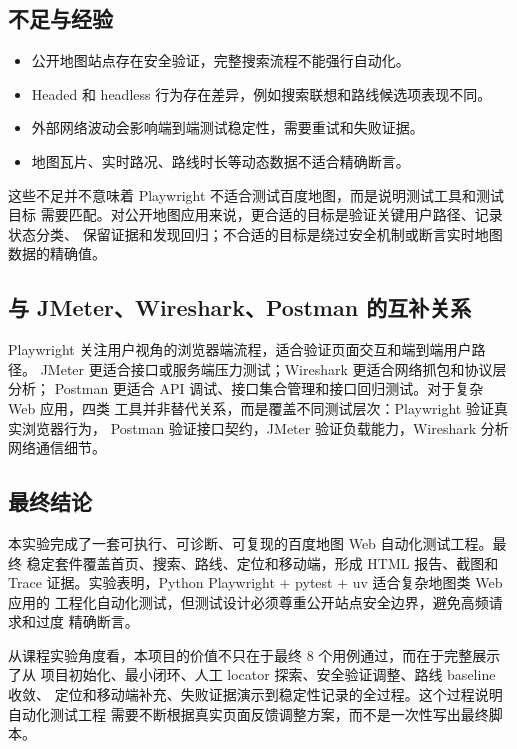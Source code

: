 \documentclass[UTF8,a4paper,12pt]{ctexart}
\begin{document}
\subsection{不足与经验}

\begin{itemize}
  \item 公开地图站点存在安全验证，完整搜索流程不能强行自动化。
  \item Headed 和 headless 行为存在差异，例如搜索联想和路线候选项表现不同。
  \item 外部网络波动会影响端到端测试稳定性，需要重试和失败证据。
  \item 地图瓦片、实时路况、路线时长等动态数据不适合精确断言。
\end{itemize}

这些不足并不意味着 Playwright 不适合测试百度地图，而是说明测试工具和测试目标
需要匹配。对公开地图应用来说，更合适的目标是验证关键用户路径、记录状态分类、
保留证据和发现回归；不合适的目标是绕过安全机制或断言实时地图数据的精确值。

\subsection{与 JMeter、Wireshark、Postman 的互补关系}

Playwright 关注用户视角的浏览器端流程，适合验证页面交互和端到端用户路径。
JMeter 更适合接口或服务端压力测试；Wireshark 更适合网络抓包和协议层分析；
Postman 更适合 API 调试、接口集合管理和接口回归测试。对于复杂 Web 应用，四类
工具并非替代关系，而是覆盖不同测试层次：Playwright 验证真实浏览器行为，
Postman 验证接口契约，JMeter 验证负载能力，Wireshark 分析网络通信细节。

\subsection{最终结论}

本实验完成了一套可执行、可诊断、可复现的百度地图 Web 自动化测试工程。最终
稳定套件覆盖首页、搜索、路线、定位和移动端，形成 HTML 报告、截图和 Trace
证据。实验表明，Python Playwright + pytest + uv 适合复杂地图类 Web 应用的
工程化自动化测试，但测试设计必须尊重公开站点安全边界，避免高频请求和过度
精确断言。

从课程实验角度看，本项目的价值不只在于最终 8 个用例通过，而在于完整展示了从
项目初始化、最小闭环、人工 locator 探索、安全验证调整、路线 baseline 收敛、
定位和移动端补充、失败证据演示到稳定性记录的全过程。这个过程说明自动化测试工程
需要不断根据真实页面反馈调整方案，而不是一次性写出最终脚本。
\end{document}
